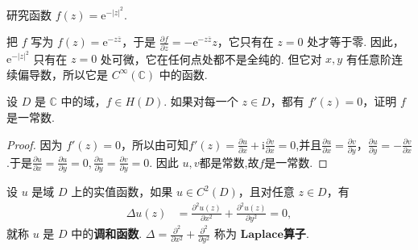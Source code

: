\documentclass[../../main.tex]{subfiles}
\begin{document}
\begin{example}
研究函数 $f(z) = \mathrm{e}^{-\vert z \vert^2}$.
\end{example}
\begin{solution}
把 $f$ 写为 $f(z) = \mathrm{e}^{-z\overline{z}}$，于是 $\frac{\partial f}{\partial \overline{z}} = -\mathrm{e}^{-z\overline{z}}z$，它只有在 $z = 0$ 处才等于零. 因此，$\mathrm{e}^{-\vert z \vert^2}$ 只有在 $z = 0$ 处可微，它在任何点处都不是全纯的. 但它对 $x, y$ 有任意阶连续偏导数，所以它是 $C^\infty(\mathbb{C})$ 中的函数.

\end{solution}

\begin{proposition}\label{proposition:复变函数导数为0必是常函数}
设 \( D \) 是 \( \mathbb{C} \) 中的域，\( f \in H(D) \). 如果对每一个 \( z \in D \)，都有 \( f'(z) = 0 \)，证明 \( f \) 是一常数.
\end{proposition}
\begin{proof}
因为 \( f'(z) = 0 \)，所以由可知\( f'(z) = \frac{\partial u}{\partial x} + \mathrm{i}\frac{\partial v}{\partial x} = 0 \),并且\( \frac{\partial u}{\partial x} = \frac{\partial v}{\partial y} \)，\( \frac{\partial u}{\partial y} = -\frac{\partial v}{\partial x} \).于是$\frac{\partial u}{\partial x}=\frac{\partial u}{\partial y}=0,\frac{\partial u}{\partial y}=\frac{\partial v}{\partial y}=0$.
因此 \( u,v \)都是常数,故$f$是一常数.

\end{proof}

\begin{definition}[调和函数]
设 $u$ 是域 $D$ 上的实值函数，如果 $u \in C^2(D)$，且对任意 $z \in D$，有
\begin{align}
\Delta u(z) &= \frac{\partial^2 u(z)}{\partial x^2} + \frac{\partial^2 u(z)}{\partial y^2} = 0, \label{eq:2.2.7}
\end{align}
就称 $u$ 是 $D$ 中的\textbf{调和函数}. $\Delta = \frac{\partial^2}{\partial x^2} + \frac{\partial^2}{\partial y^2}$ 称为 $\mathbf{Laplace}$\textbf{算子}.
\end{definition}
\end{document}
